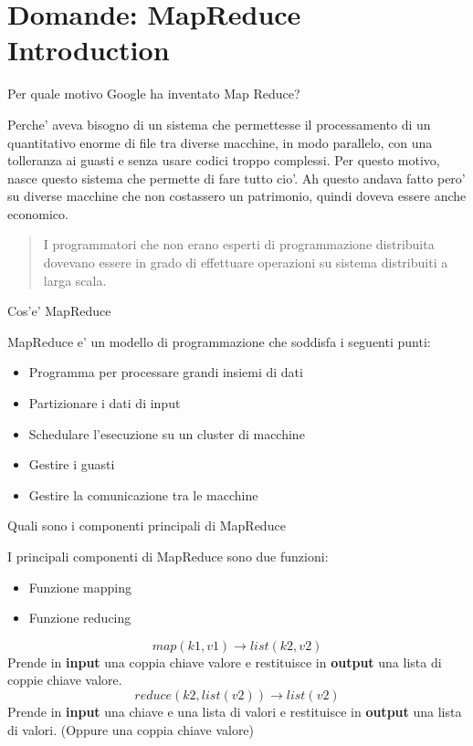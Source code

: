 \section{Domande: MapReduce Introduction}
\begin{domanda}
    Per quale motivo Google ha inventato Map Reduce?
\end{domanda}

Perche' aveva bisogno di un sistema che permettesse il processamento di un
quantitativo enorme di file tra diverse macchine, in modo parallelo, con una
tolleranza ai guasti e senza usare codici troppo complessi. Per questo motivo,
nasce questo sistema che permette di fare tutto cio'. Ah questo andava fatto
pero' su diverse macchine che non costassero un patrimonio, quindi doveva
essere anche economico.

\begin{quote}
    I programmatori che non erano esperti di programmazione distribuita dovevano essere in grado di effettuare operazioni su sistema distribuiti a larga scala.
\end{quote}

\begin{domanda}
    Cos'e' MapReduce
\end{domanda}

MapReduce e' un modello di programmazione che soddisfa i seguenti punti:
\begin{itemize}
    \item Programma per processare grandi insiemi di dati 
    \item Partizionare i dati di input 
    \item Schedulare l'esecuzione su un cluster di macchine
    \item Gestire i guasti
    \item Gestire la comunicazione tra le macchine
\end{itemize}

\begin{domanda}
    Quali sono i componenti principali di MapReduce
\end{domanda}

I principali componenti di MapReduce sono due funzioni:
\begin{itemize}
    \item Funzione mapping
    \item Funzione reducing
\end{itemize}

\[
  map(k1,v1) \rightarrow list(k2,v2)
\]
Prende in \textbf{input} una coppia chiave valore e restituisce in \textbf{output} una lista di
coppie chiave valore.
\[
  reduce(k2,list(v2)) \rightarrow list(v2)
\]
Prende in \textbf{input} una chiave e una lista di valori e restituisce in \textbf{output} una lista di
valori. (Oppure una coppia chiave valore)

